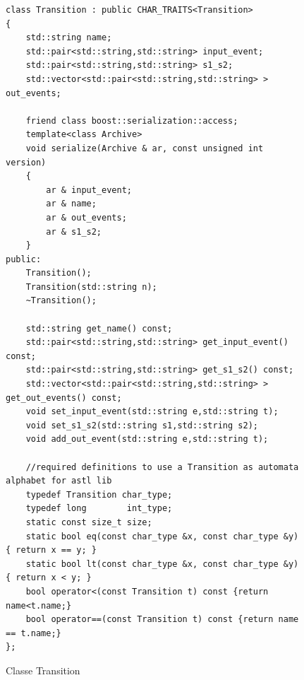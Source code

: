 \begin{figure}[htbp]
\centering
\begin{verbatim}
class Transition : public CHAR_TRAITS<Transition>
{
    std::string name;
    std::pair<std::string,std::string> input_event;
    std::pair<std::string,std::string> s1_s2;
    std::vector<std::pair<std::string,std::string> > out_events;

    friend class boost::serialization::access;
    template<class Archive>
    void serialize(Archive & ar, const unsigned int version)
    {
        ar & input_event;
        ar & name;
        ar & out_events;
        ar & s1_s2;
    }
public:
    Transition();
    Transition(std::string n);
    ~Transition();

    std::string get_name() const;
    std::pair<std::string,std::string> get_input_event() const;
    std::pair<std::string,std::string> get_s1_s2() const;
    std::vector<std::pair<std::string,std::string> > get_out_events() const;
    void set_input_event(std::string e,std::string t);
    void set_s1_s2(std::string s1,std::string s2);
    void add_out_event(std::string e,std::string t);

    //required definitions to use a Transition as automata alphabet for astl lib
    typedef Transition char_type;
    typedef long        int_type;
    static const size_t size;
    static bool eq(const char_type &x, const char_type &y) { return x == y; }
    static bool lt(const char_type &x, const char_type &y) { return x < y; }
    bool operator<(const Transition t) const {return name<t.name;}
    bool operator==(const Transition t) const {return name == t.name;}
};
\end{verbatim}
\caption{Classe Transition}
\label{class_trans}
\end{figure}

